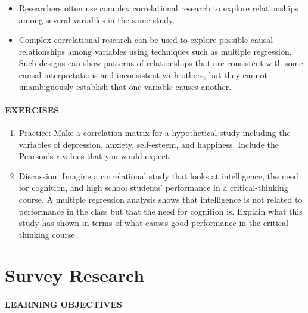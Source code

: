 \documentclass[
]{krantz}
\providecommand{\tightlist}{%
  \setlength{\itemsep}{0pt}\setlength{\parskip}{0pt}}
\begin{document}
\begin{itemize}
\tightlist
\item
  Researchers often use complex correlational research to explore relationships among several variables in the same study.
\item
  Complex correlational research can be used to explore possible causal relationships among variables using techniques such as multiple regression. Such designs can show patterns of relationships that are consistent with some causal interpretations and inconsistent with others, but they cannot unambiguously establish that one variable causes another.
\end{itemize}

\paragraph*{EXERCISES}\label{exercises-16}

\begin{enumerate}
\def\labelenumi{\arabic{enumi}.}
\tightlist
\item
  Practice: Make a correlation matrix for a hypothetical study including the variables of depression, anxiety, self-esteem, and happiness. Include the Pearson's r values that you would expect.
\item
  Discussion: Imagine a correlational study that looks at intelligence, the need for cognition, and high school students' performance in a critical-thinking course. A multiple regression analysis shows that intelligence is not related to performance in the class but that the need for cognition is. Explain what this study has shown in terms of what causes good performance in the critical-thinking course.
\end{enumerate}

\section{Survey Research}\label{survey-research-1}

\paragraph*{LEARNING OBJECTIVES}\label{learning-objectives-21}
\end{document}
